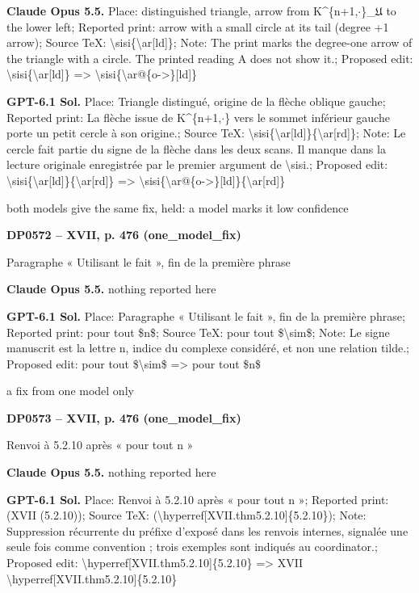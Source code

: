 \textbf{Claude Opus 5.5.} Place: distinguished triangle, arrow from K\textasciicircum{}\{n+1,\ensuremath{\cdot}\}\_\ensuremath{𝔘} to the lower left; Reported print: arrow with a small circle at its tail (degree +1 arrow); Source TeX: \textbackslash{}sisi\{\textbackslash{}ar[ld]\}; Note: The print marks the degree-one arrow of the triangle with a circle. The printed reading A does not show it.; Proposed edit: \textbackslash{}sisi\{\textbackslash{}ar[ld]\} =\allowbreak > \textbackslash{}sisi\{\textbackslash{}ar@\{o->\}[ld]\}\par
\textbf{GPT-6.1 Sol.} Place: Triangle distingué, origine de la flèche oblique gauche; Reported print: La flèche issue de K\textasciicircum{}\{n+1,\ensuremath{\cdot}\} vers le sommet inférieur gauche porte un petit cercle à son origine.; Source TeX: \textbackslash{}sisi\{\textbackslash{}ar[ld]\}\{\textbackslash{}ar[rd]\}; Note: Le cercle fait partie du signe de la flèche dans les deux scans. Il manque dans la lecture originale enregistrée par le premier argument de \textbackslash{}sisi.; Proposed edit: \textbackslash{}sisi\{\textbackslash{}ar[ld]\}\{\textbackslash{}ar[rd]\} =\allowbreak > \textbackslash{}sisi\{\textbackslash{}ar@\{o->\}[ld]\}\{\textbackslash{}ar[rd]\}\par
both models give the same fix, held: a model marks it low confidence\par
\par\noindent\hypertarget{DP0572}{}\textbf{DP0572 -- XVII, p. 476 (one\_model\_fix)}\par
Paragraphe « Utilisant le fait », fin de la première phrase\par
\textbf{Claude Opus 5.5.} nothing reported here\par
\textbf{GPT-6.1 Sol.} Place: Paragraphe « Utilisant le fait », fin de la première phrase; Reported print: pour tout \$n\$; Source TeX: pour tout \$\textbackslash{}sim\$; Note: Le signe manuscrit est la lettre n, indice du complexe considéré, et non une relation tilde.; Proposed edit: pour tout \$\textbackslash{}sim\$ =\allowbreak > pour tout \$n\$\par
a fix from one model only\par
\par\noindent\hypertarget{DP0573}{}\textbf{DP0573 -- XVII, p. 476 (one\_model\_fix)}\par
Renvoi à 5.2.10 après « pour tout n »\par
\textbf{Claude Opus 5.5.} nothing reported here\par
\textbf{GPT-6.1 Sol.} Place: Renvoi à 5.2.10 après « pour tout n »; Reported print: (XVII (5.2.10)); Source TeX: (\textbackslash{}hyperref[XVII.thm5.2.10]\{5.2.10\}); Note: Suppression récurrente du préfixe d'exposé dans les renvois internes, signalée une seule fois comme convention ; trois exemples sont indiqués au coordinator.; Proposed edit: \textbackslash{}hyperref[XVII.thm5.2.10]\{5.2.10\} =\allowbreak > XVII \textbackslash{}hyperref[XVII.thm5.2.10]\{5.2.10\}\par

